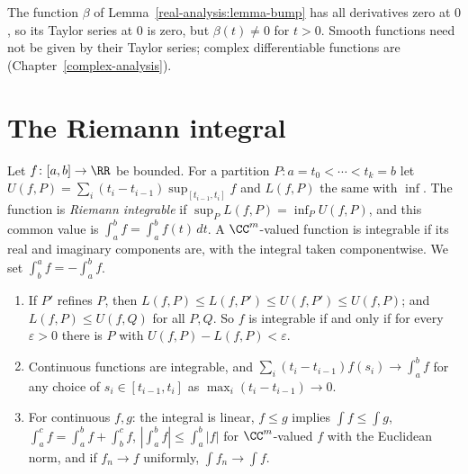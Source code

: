 \begin{counterexample}\label{real-analysis:counterexample-not-analytic}
The function $\beta$ of Lemma~\ref{real-analysis:lemma-bump} has all derivatives zero at $0$, so its Taylor series at $0$ is zero, but $\beta(t) \neq 0$ for $t > 0$. Smooth functions need not be
given by their Taylor series; complex differentiable functions are (Chapter~\ref{complex-analysis}).
\end{counterexample}

\section{The Riemann integral}\label{real-analysis:section-riemann}

\begin{definition}\label{real-analysis:definition-riemann}
Let $f \colon [a, b] \to \RR$ be bounded. For a partition $P \colon a = t_0 < \cdots < t_k = b$ let $U(f, P) = \sum_i(t_i - t_{i-1})\sup_{[t_{i-1}, t_i]}f$ and $L(f, P)$ the same with $\inf$. The function is
\emph{Riemann integrable} if $\sup_PL(f, P) = \inf_PU(f, P)$, and this common value is $\int_a^bf = \int_a^bf(t)\,dt$. A $\CC^m$-valued function is integrable if its real and imaginary components are, with
the integral taken componentwise. We set $\int_b^af = -\int_a^bf$.
\end{definition}

\begin{proposition}\label{real-analysis:proposition-riemann}
\begin{enumerate}
\item If $P'$ refines $P$, then $L(f, P) \leq L(f, P') \leq U(f, P') \leq U(f, P)$; and $L(f, P) \leq U(f, Q)$ for all $P, Q$. So $f$ is integrable if and only if for every $\varepsilon > 0$ there is $P$ with
$U(f, P) - L(f, P) < \varepsilon$.
\item Continuous functions are integrable, and $\sum_i(t_i - t_{i-1})f(s_i) \to \int_a^bf$ for any choice of $s_i \in [t_{i-1}, t_i]$ as $\max_i(t_i - t_{i-1}) \to 0$.
\item For continuous $f, g$: the integral is linear, $f \leq g$ implies $\int f \leq \int g$, $\int_a^cf = \int_a^bf + \int_b^cf$, $|\int_a^bf| \leq \int_a^b|f|$ for $\CC^m$-valued $f$ with the Euclidean
norm, and if $f_n \to f$ uniformly, $\int f_n \to \int f$.
\end{enumerate}
\end{proposition}

